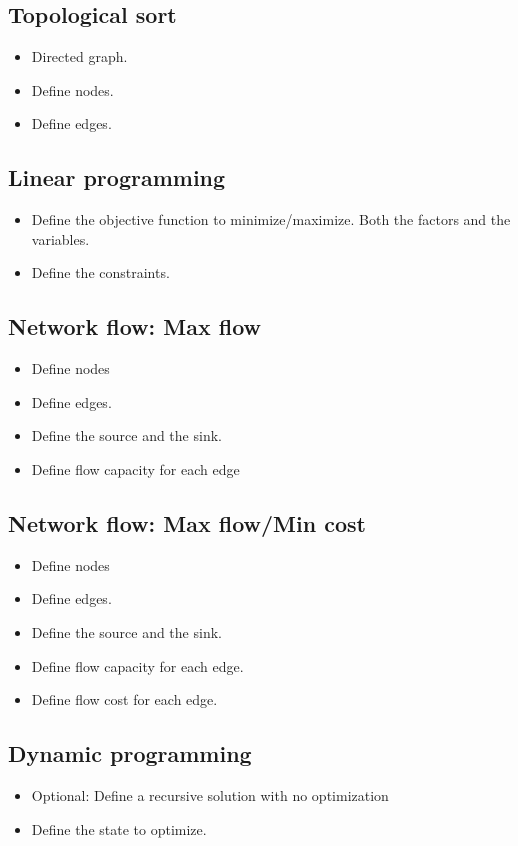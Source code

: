 \documentclass[guide.tex]{subfiles}
\begin{document}
\subsection{Topological sort}
\begin{itemize}
  \item Directed graph.
  \item Define nodes.
  \item Define edges.
\end{itemize}

\subsection{Linear programming}
\begin{itemize}
  \item Define the objective function to minimize/maximize. Both the factors and the variables.
  \item Define the constraints.
\end{itemize}

\subsection{Network flow: Max flow}
\begin{itemize}
  \item Define nodes
  \item Define edges.
  \item Define the source and the sink.
  \item Define flow capacity for each edge
\end{itemize}

\subsection{Network flow: Max flow/Min cost}
\begin{itemize}
  \item Define nodes
  \item Define edges.
  \item Define the source and the sink.
  \item Define flow capacity for each edge.
  \item Define flow cost for each edge.
\end{itemize}

\subsection{Dynamic programming}
\begin{itemize}
  \item Optional: Define a recursive solution with no optimization
  \item Define the state to optimize.
\end{itemize}
\end{document}
